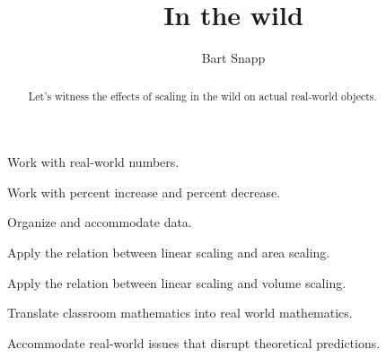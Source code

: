 \documentclass[nooutcomes,noauthor,handout,12pt]{ximera}
\title{In the wild}
\author{Bart Snapp}
\begin{document}
\begin{abstract}
  Let's witness the effects of scaling in the wild on actual
  real-world objects.
\end{abstract}
\maketitle


\begin{listOutcomes}
\item Work with real-world numbers.
\item Work with percent increase and percent decrease.
\item Organize and accommodate data.
\item Apply the relation between linear scaling and area scaling.
\item Apply the relation between linear scaling and volume scaling.
\item Translate classroom mathematics into real world mathematics. 
\item Accommodate real-world issues that disrupt theoretical predictions.
\end{listOutcomes}





\mynewpage



\end{document}
